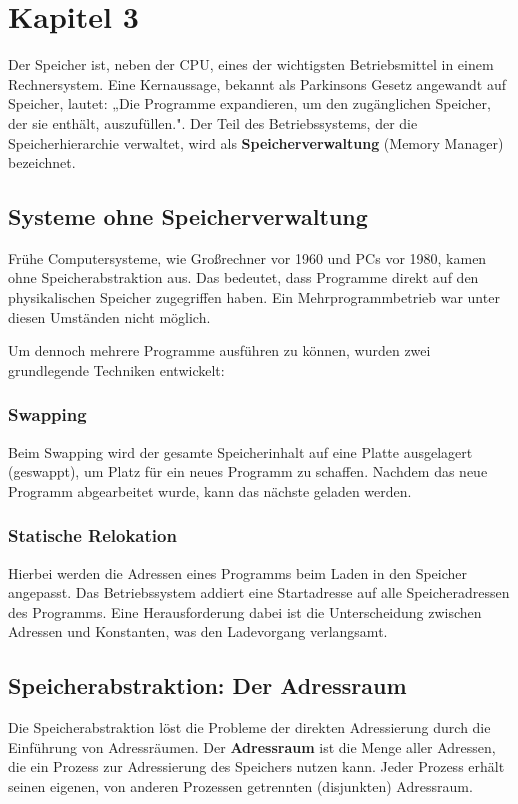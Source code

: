 \chapter{Kapitel 3}

Der Speicher ist, neben der CPU, eines der wichtigsten Betriebsmittel in einem Rechnersystem. Eine Kernaussage, bekannt als Parkinsons Gesetz angewandt auf Speicher, lautet: „Die Programme expandieren, um den zugänglichen Speicher, der sie enthält, auszufüllen.". Der Teil des Betriebssystems, der die Speicherhierarchie verwaltet, wird als \textbf{Speicherverwaltung} (Memory Manager) bezeichnet.

\section{Systeme ohne Speicherverwaltung}

Frühe Computersysteme, wie Großrechner vor 1960 und PCs vor 1980, kamen ohne Speicherabstraktion aus. Das bedeutet, dass Programme direkt auf den physikalischen Speicher zugegriffen haben. Ein Mehrprogrammbetrieb war unter diesen Umständen nicht möglich.

Um dennoch mehrere Programme ausführen zu können, wurden zwei grundlegende Techniken entwickelt:

\subsection{Swapping}
Beim Swapping wird der gesamte Speicherinhalt auf eine Platte ausgelagert (geswappt), um Platz für ein neues Programm zu schaffen. Nachdem das neue Programm abgearbeitet wurde, kann das nächste geladen werden.

\subsection{Statische Relokation}
Hierbei werden die Adressen eines Programms beim Laden in den Speicher angepasst. Das Betriebssystem addiert eine Startadresse auf alle Speicheradressen des Programms. Eine Herausforderung dabei ist die Unterscheidung zwischen Adressen und Konstanten, was den Ladevorgang verlangsamt.

\section{Speicherabstraktion: Der Adressraum}

Die Speicherabstraktion löst die Probleme der direkten Adressierung durch die Einführung von Adressräumen. Der \textbf{Adressraum} ist die Menge aller Adressen, die ein Prozess zur Adressierung des Speichers nutzen kann. Jeder Prozess erhält seinen eigenen, von anderen Prozessen getrennten (disjunkten) Adressraum.

